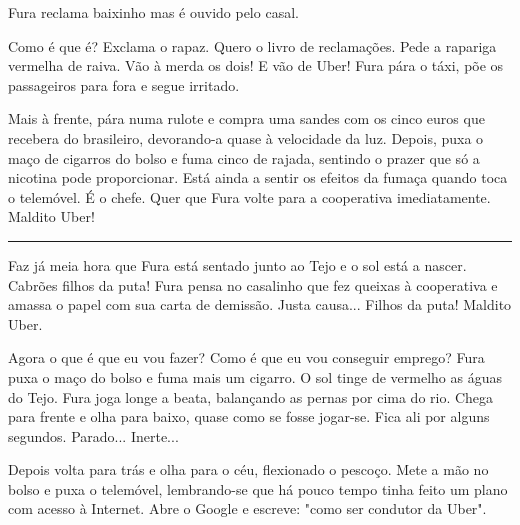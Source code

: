 \documentclass[12pt]{creativeWriting}
\begin{document}
 Fura reclama baixinho mas é ouvido pelo casal.

Como é que é? Exclama o rapaz. Quero o livro de reclamações. Pede a rapariga vermelha de raiva. Vão à merda os dois! E vão de Uber! Fura pára o táxi, põe os passageiros para fora e segue irritado.

Mais à frente, pára numa rulote e compra uma sandes com os cinco euros que recebera do brasileiro, devorando-a quase à velocidade da luz. Depois, puxa o maço de cigarros do bolso e fuma cinco de rajada, sentindo o prazer que só a nicotina pode proporcionar. Está ainda a sentir os efeitos da fumaça quando toca o telemóvel. É o chefe. Quer que Fura volte para a cooperativa imediatamente. Maldito Uber!

\rule[0.5ex]{\linewidth}{1pt}

Faz já meia hora que Fura está sentado junto ao Tejo e o sol está a nascer. Cabrões filhos da puta! Fura pensa no casalinho que fez queixas à cooperativa e amassa o papel com sua carta de demissão. Justa causa... Filhos da puta! Maldito Uber.

Agora o que é que eu vou fazer? Como é que eu vou conseguir emprego? Fura puxa o maço do bolso e fuma mais um cigarro. O sol tinge de vermelho as águas do Tejo. Fura joga longe a beata, balançando as pernas por cima do rio. Chega para frente e olha para baixo, quase como se fosse jogar-se. Fica ali por alguns segundos. Parado... Inerte...

Depois volta para trás e olha para o céu, flexionado o pescoço. Mete a mão no bolso e puxa o telemóvel, lembrando-se que há pouco tempo tinha feito um plano com acesso à Internet. Abre o Google e escreve: "como ser condutor da Uber".
\end{document}
